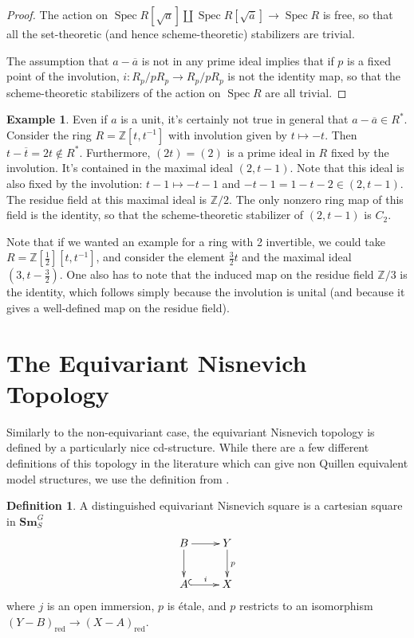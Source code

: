 \documentclass[edeposit,fullpage]{uiucthesis2009}
\newcommand{\Z}{\mathbb Z}
\newcommand{\Sm}[1]{\mathbf{Sm}_{#1}}
\DeclareMathOperator{\Spec}{Spec}
\theoremstyle{plain}
\numberwithin{lemma}{section}
\theoremstyle{definition}
\newtheorem{example}[lemma]{Example}
\newtheorem{definition}[lemma]{Definition}
\begin{document}
\begin{proof}
The action on $ \Spec R[\sqrt{a}] \coprod \Spec
R[\sqrt{\overline a}] \rightarrow \Spec R$ is free, so that all the
set-theoretic (and hence scheme-theoretic) stabilizers are trivial. 

The assumption that $a - \overline a$ is not in any prime ideal implies that
if $p$ is a fixed point of the involution, $i : R_p/pR_p \rightarrow
R_p/pR_p$ is not the identity map, so that the scheme-theoretic
stabilizers of the action on $\Spec R$ are all trivial.
\end{proof}

\begin{example}
Even if $a$ is a unit, it's certainly not true in general that
$ a - \overline a \in R^*$. Consider the ring $R = \Z[t,t^{-1}]$ with
involution given by $t \mapsto -t$. Then $t - \overline t = 2t \not
\in R^*$. Furthermore, $(2t) = (2)$ is a prime ideal in $R$ fixed by
the involution. It's contained in the maximal ideal $(2,t-1)$. Note
that this ideal is also fixed by the involution: $t - 1 \mapsto -t-1$
and $-t-1 = 1-t -2 \in (2,t-1)$. The residue field at this maximal
ideal is $\Z/2$. The only nonzero ring map of this field is the
identity, so that the scheme-theoretic stabilizer of $(2,t-1)$ is
$C_2$.

Note that if we wanted an example for a ring with 2 invertible, we
could take $R=\Z[\frac{1}{2}][t,t^{-1}]$, and consider the element
$\frac{3}{2}t$ and the maximal ideal $(3,t-\frac{3}{2})$. One also has
to note that the induced map on the residue field $\Z/3$ is the
identity, which follows simply because the involution is unital (and
because it gives a well-defined map on the residue field).
\end{example}

\section{The Equivariant Nisnevich Topology}

Similarly to the non-equivariant case, the equivariant Nisnevich
topology is defined by a particularly nice cd-structure. While there are
a few different definitions of this topology in the literature which
can give non Quillen equivalent model structures, we use the
definition from \cite{GrpSchHell}.

\begin{definition}
A distinguished equivariant Nisnevich square is a cartesian square in
$\Sm{S}^G$
\[
\xymatrix{B \ar[r]\ar[d] & Y \ar[d]^p \\ A \ar@{^{(}->}[r]^i & X}
\]
where $j$ is an open immersion, $p$ is \'etale, and $p$ restricts to
an isomorphism
$(Y-B)_{\mathrm{red}} \rightarrow (X-A)_{\mathrm{red}}$. 
\end{definition}
\end{document}
